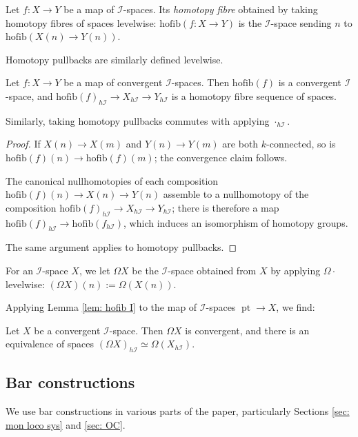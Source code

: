 \documentclass{TPmod}
\newcommand{\hofib}{\mathrm{hofib}}
\newcommand{\pt}{\operatorname{pt}}
\newcommand{\cI}{\mathcal{I}}
\numberwithin{equation}{section}
\begin{document}
    \begin{defn}
        Let $f: X \to Y$ be a map of $\cI$-spaces. Its \emph{homotopy fibre} obtained by taking homotopy fibres of spaces levelwise: $\hofib(f: X \to Y)$ is the $\cI$-space sending $n$ to $\hofib(X(n) \to Y(n))$.

        Homotopy pullbacks are similarly defined levelwise.
    \end{defn}
    \begin{lem}\label{lem: hofib I}
        Let $f: X \to Y$ be a map of convergent $\cI$-spaces. Then $\hofib(f)$ is a convergent $\cI$-space, and $\hofib(f)_{h\cI} \to X_{h\cI} \to Y_{h\cI}$ is a homotopy fibre sequence of spaces.

        Similarly, taking homotopy pullbacks commutes with applying $\cdot_{h\cI}$.
    \end{lem}
    \begin{proof}
        If $X(n) \to X(m)$ and $Y(n) \to Y(m)$ are both $k$-connected, so is $\hofib(f)(n) \to \hofib(f)(m)$; the convergence claim follows.

        The canonical nullhomotopies of each composition $\hofib(f)(n) \to X(n) \to Y(n)$ assemble to a nullhomotopy of the composition $\hofib(f)_{h\cI} \to X_{h\cI} \to Y_{h\cI}$; there is therefore a map $\hofib(f)_{h\cI} \to \hofib(f_{h\cI})$, which induces an isomorphism of homotopy groups.

        The same argument applies to homotopy pullbacks.
    \end{proof}

    For an $\cI$-space $X$, we let $\Omega X$ be the $\cI$-space obtained from $X$ by applying $\Omega \cdot$ levelwise: $(\Omega X)(n) := \Omega(X(n))$.

    Applying Lemma \ref{lem: hofib I} to the map of $\cI$-spaces $\pt \to X$, we find:
    \begin{cor}
        Let $X$ be a convergent $\cI$-space. Then $\Omega X$ is convergent, and there is an equivalence of spaces $(\Omega X)_{h\cI} \simeq \Omega(X_{h\cI})$.
    \end{cor}


\subsection{Bar constructions}\label{sec: bar}
    We use bar constructions in various parts of the paper, particularly Sections \ref{sec: mon loco sys} and \ref{sec: OC}.
\end{document}
